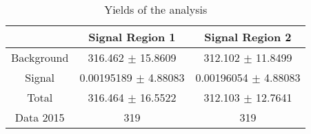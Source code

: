 \documentclass[10pt]{article}
\begin{document}
\begin{table}[htbp]
\begin{center}
\begin{tabular}{|c|c|c|}
\hline 
 & Signal Region 1 & Signal Region 2\\
\hline 
  Background   & \num[round-mode=figures,round-precision=3]{316.462} $\pm$ \num[round-mode=figures,round-precision=3]{15.8609} & \num[round-mode=figures,round-precision=3]{312.102} $\pm$ \num[round-mode=figures,round-precision=3]{11.8499} \\ 
  Signal   & \num[round-mode=figures,round-precision=3]{0.00195189} $\pm$ \num[round-mode=figures,round-precision=3]{4.88083} & \num[round-mode=figures,round-precision=3]{0.00196054} $\pm$ \num[round-mode=figures,round-precision=3]{4.88083} \\ 
\hline 
  Total  & \num[round-mode=figures,round-precision=3]{316.464} $\pm$ \num[round-mode=figures,round-precision=3]{16.5522} & \num[round-mode=figures,round-precision=3]{312.103} $\pm$ \num[round-mode=figures,round-precision=3]{12.7641} \\ 
\hline 
  Data 2015   & 319 & 319 \\ 
\hline 
\end{tabular} 
\caption{Yields of the analysis} 
\end{center} 
\end{table} 
\end{document}
